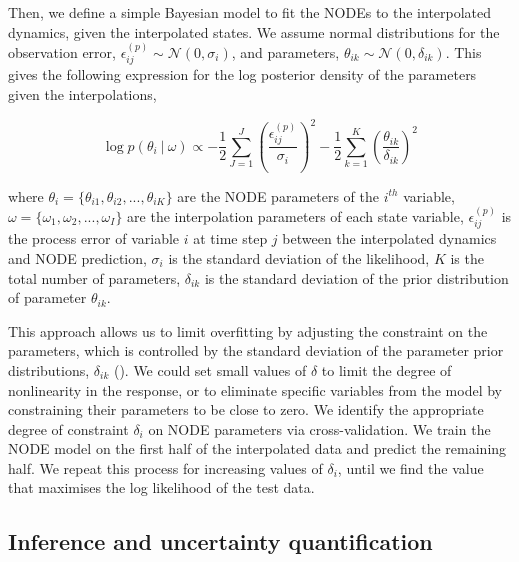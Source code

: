 \documentclass[11pt, oneside]{article}
\begin{document}
Then, we define a simple Bayesian model to fit the NODEs to the interpolated dynamics, given the interpolated states.
We assume normal distributions for the observation error, $\epsilon^{(p)}_{ij} \sim \mathcal{N}(0,\sigma_i)$, and parameters, $\theta_{ik} \sim \mathcal{N}(0,\delta_{ik})$.
This gives the following expression for the log posterior density of the parameters given the interpolations,

\vspace{-0.5cm}
\begin{equation}
    \log p(\theta_i ~|~ \omega) \propto - \frac{1}{2} \sum_{J=1}^{J} \left( \frac{\epsilon^{(p)}_{ij}}{\sigma_i} \right)^2 - \frac{1}{2} \sum_{k=1}^{K} \left( \frac{\theta_{ik}}{\delta_{ik}} \right)^2
\end{equation}

where $\theta_i = \{\theta_{i1},\theta_{i2},...,\theta_{iK}\}$ are the NODE parameters of the $i^{th}$ variable,
$\omega = \{\omega_1,\omega_2,...,\omega_I\}$ are the interpolation parameters of each state variable, 
$\epsilon^{(p)}_{ij}$ is the process error of variable $i$ at time step $j$ between the interpolated dynamics and NODE prediction, 
$\sigma_i$ is the standard deviation of the likelihood, 
$K$ is the total number of parameters, 
$\delta_{ik}$ is the standard deviation of the prior distribution of parameter $\theta_{ik}$.

This approach allows us to limit overfitting by adjusting the constraint on the parameters, which is controlled by the standard deviation of the parameter prior distributions, $\delta_{ik}$ (\cite{Cawley2007, Bonnaffe2021a}).
We could set small values of $\delta$ to limit the degree of nonlinearity in the response, or to eliminate specific variables from the model by constraining their parameters to be close to zero.
We identify the appropriate degree of constraint $\delta_{i}$ on NODE parameters via cross-validation. 
We train the NODE model on the first half of the interpolated data and predict the remaining half.
We repeat this process for increasing values of $\delta_{i}$, until we find the value that maximises the log likelihood of the test data.

\subsection{Inference and uncertainty quantification}
\end{document}
